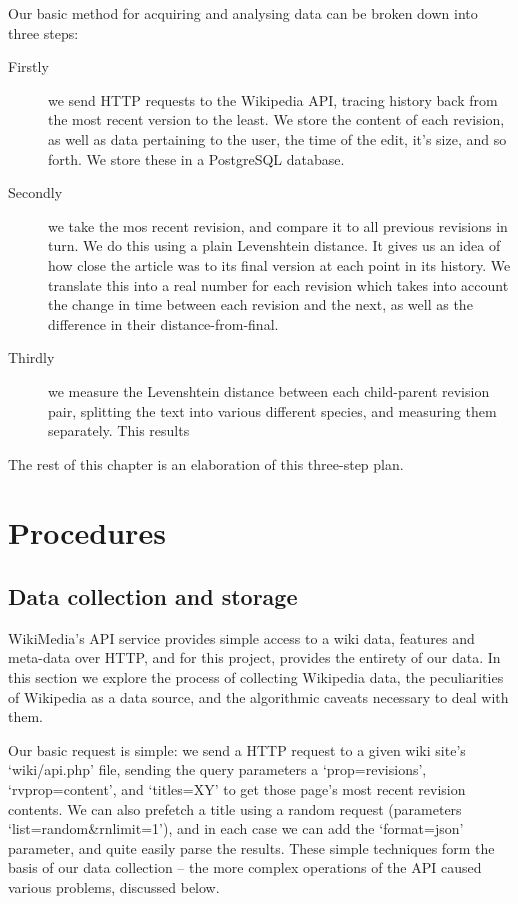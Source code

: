 Our basic method for acquiring and analysing data can be broken down
into three steps:

\begin{description}
\item[Firstly] we send HTTP requests to the Wikipedia API, tracing
  history back from the most recent version to the least. We store the
  content of each revision, as well as data pertaining to the user,
  the time of the edit, it's size, and so forth. We store these in a
  PostgreSQL database.
\item[Secondly] we take the mos recent revision, and compare it to all
  previous revisions in turn. We do this using a plain Levenshtein
  distance. It gives us an idea of how close the article was to its
  final version at each point in its history. We translate this into a
  real number for each revision which takes into account the change in
  time between each revision and the next, as well as the difference
  in their distance-from-final.
\item[Thirdly] we measure the Levenshtein distance between each
  child-parent revision pair, splitting the text into various
  different species, and measuring them separately. This results
\end{description}

The rest of this chapter is an elaboration of this three-step plan.

\section{Procedures}
\subsection*{Data collection and storage}
\label{sec:wiki-api}
WikiMedia's API service provides simple access to a wiki data,
features and meta-data over HTTP,\cite{wiki-api} and for this project,
provides the entirety of our data. In this section we explore the
process of collecting Wikipedia data, the peculiarities of Wikipedia
as a data source, and the algorithmic caveats necessary to deal with
them.

Our basic request is simple: we send a HTTP request to a given wiki
site's `wiki/api.php' file, sending the query parameters a
`prop=revisions', `rvprop=content', and `titles=X{\textbar}Y' to get those
page's most recent revision contents. We can also prefetch a title
using a random request (parameters `list=random\&rnlimit=1'), and in
each case we can add the `format=json' parameter, and quite easily
parse the results. These simple techniques form the basis of our data
collection -- the more complex operations of the API caused various
problems, discussed below.

